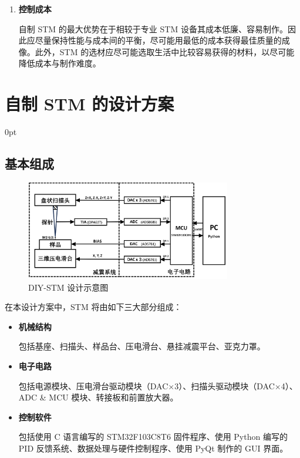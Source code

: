 \documentclass[zihao=-4]{ctexart}
\newcommand{\setParDis}{\setlength {\parskip} {0pt} }
\begin{document}
\begin{spacing}{1.5}
\begin{enumerate}
		
		\item \textbf{控制成本}\par
		\qquad 自制 STM 的最大优势在于相较于专业 STM 设备其成本低廉、容易制作。因此应尽量保持性能与成本间的平衡，尽可能用最低的成本获得最佳质量的成像。此外，STM 的选材应尽可能选取生活中比较容易获得的材料，以尽可能降低成本与制作难度。

	\end{enumerate}
	


	
	
	
	
	
	

\clearpage
\section{自制 STM 的设计方案}
	\setParDis %
	\subsection{基本组成}
		\begin{figure}[htbp]
			\centering 
			\includegraphics[width=0.8\textwidth]{fig88.png}
			\caption{DIY-STM 设计示意图}
		\end{figure}	
		
		在本设计方案中，STM 将由如下三大部分组成：
		
		\begin{itemize}
			\item \textbf{机械结构}\par
			\qquad 包括基座、扫描头、样品台、压电滑台、悬挂减震平台、亚克力罩。
	
			\item \textbf{电子电路}\par
			\qquad 包括电源模块、压电滑台驱动模块（DAC$\times$3）、扫描头驱动模块（DAC$\times$4）、ADC \& MCU 模块、转接板和前置放大器。
			
			
			\item \textbf{控制软件}\par
			\qquad 包括使用 C 语言编写的 STM32F103C8T6 固件程序、使用 Python 编写的 PID 反馈系统、数据处理与硬件控制程序、使用 PyQt 制作的 GUI 界面。
			

\end{itemize}
\end{spacing}
\end{document}
